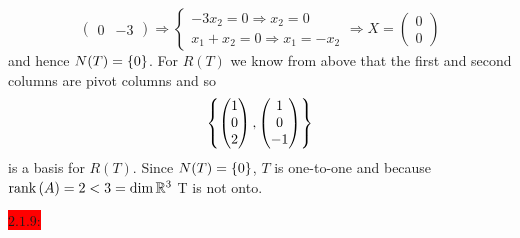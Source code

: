\documentclass{exam}
\begin{document}
\begin{solution}
\[\begin{pmatrix}
        0 & -3 
      \end{pmatrix}
      \Rightarrow \begin{cases}
        -3x_2 = 0 \Rightarrow x_2 = 0 \\
        x_1 + x_2 = 0 \Rightarrow x_1 = -x_2
      \end{cases}
      \Rightarrow X = \begin{pmatrix}
        0 \\ 0
      \end{pmatrix}
    \]
    and hence $N(T) = \left\{0 \right\}$. For $R(T)$ we know from above that the first and second columns are pivot columns and so 
    \[
      \left\{
        \begin{pmatrix}
          1 \\ 0 \\ 2
        \end{pmatrix},
        \begin{pmatrix}
          1 \\ 0 \\ -1
        \end{pmatrix}
       \right\}
    \]
    is a basis for $R(T)$. Since $N(T) = \left\{0 \right\}$, $T$ is one-to-one and because $\text{rank}\left(A\right) = 2 < 3 = \dim \mathbb R^3$ T is not onto.
  \end{solution}

  \colorbox{red}{\underline{$2.1.9$}:}
  \begin{solution}
  \end{solution}
\end{document}
